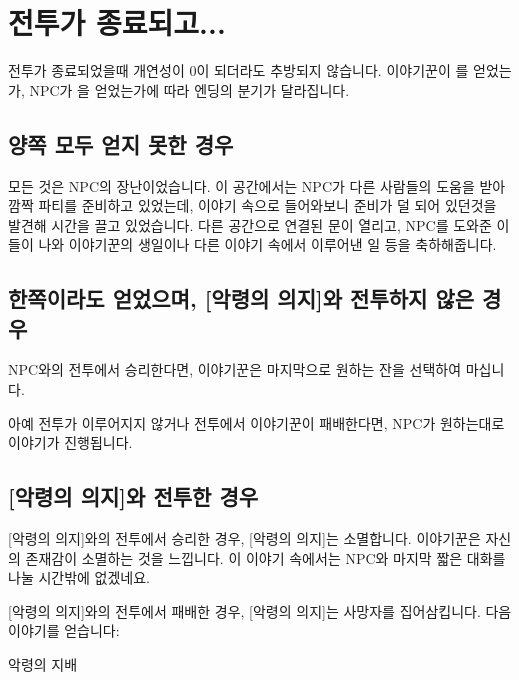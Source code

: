 \documentclass{report}
\begin{document}
	\section{전투가 종료되고...}
	전투가 종료되었을때 개연성이 0이 되더라도 추방되지 않습니다. 이야기꾼이 를 얻었는가, NPC가 을 얻었는가에 따라 엔딩의 분기가 달라집니다.
	
		\subsection{양쪽 모두 얻지 못한 경우}
			모든 것은 NPC의 장난이었습니다. 이 공간에서는 NPC가 다른 사람들의 도움을 받아 깜짝 파티를 준비하고 있었는데, 이야기 속으로 들어와보니 준비가 덜 되어 있던것을 발견해 시간을 끌고 있었습니다. 다른 공간으로 연결된 문이 열리고, NPC를 도와준 이들이 나와 이야기꾼의 생일이나 다른 이야기 속에서 이루어낸 일 등을 축하해줍니다.
			
		\subsection{한쪽이라도 얻었으며, [악령의 의지]와 전투하지 않은 경우}
			NPC와의 전투에서 승리한다면, 이야기꾼은 마지막으로 원하는 잔을 선택하여 마십니다.
			
			아예 전투가 이루어지지 않거나 전투에서 이야기꾼이 패배한다면, NPC가 원하는대로 이야기가 진행됩니다.
		
		\subsection{[악령의 의지]와 전투한 경우}
			[악령의 의지]와의 전투에서 승리한 경우, [악령의 의지]는 소멸합니다. 이야기꾼은 자신의 존재감이 소멸하는 것을 느낍니다. 이 이야기 속에서는 NPC와 마지막 짧은 대화를 나눌 시간밖에 없겠네요.
			
			[악령의 의지]와의 전투에서 패배한 경우, [악령의 의지]는 사망자를 집어삼킵니다. 다음 이야기를 얻습니다:
			\begin{lite}{악령의 지배}
			\end{lite}
			
\end{document}

